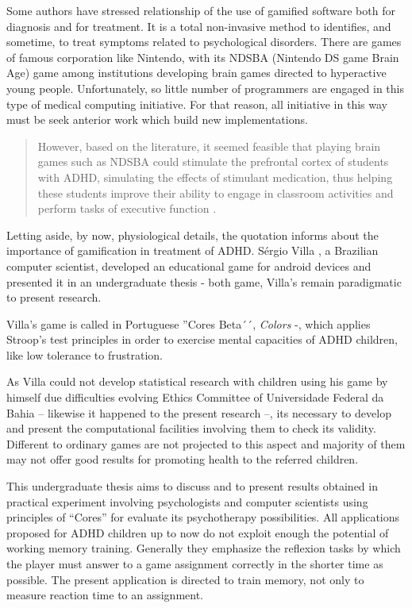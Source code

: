 Some authors have stressed relationship of the use of gamified software both for diagnosis and for treatment. It is a total non-invasive method to identifies, and sometime, to treat symptoms related to psychological disorders. There are games of famous corporation like Nintendo, with its NDSBA (Nintendo DS game Brain Age) game among institutions developing brain games directed to hyperactive young people. Unfortunately, so little number of programmers are engaged in this type of medical computing initiative. For that reason, all initiative in this way must be seek anterior work which build new implementations. 

\begin{quote}
However, based on the literature, it seemed feasible that playing brain games such as NDSBA could stimulate the prefrontal cortex of students with ADHD, simulating the effects of stimulant medication, thus helping these students improve their ability to engage in classroom activities and perform tasks of executive function \citep{brainGames}. 
\end{quote}

Letting aside, by now, physiological details, the quotation informs about the importance of gamification in treatment of ADHD. S\'{e}rgio Villa \citeyearpar{Villa}, a Brazilian computer scientist, developed an educational game for android devices and presented it in an undergraduate thesis - both game, Villa's remain paradigmatic to present research.

Villa's game is called in Portuguese ''Cores Beta´´, \textit{Colors} -, which applies Stroop's test principles in order to exercise mental capacities of ADHD children, like low tolerance to frustration. 

As Villa \citeyearpar{Villa} could not develop statistical research with children using his game by himself due difficulties evolving Ethics Committee of Universidade Federal da Bahia -- likewise it happened to the present research --, its necessary to develop and present the computational facilities involving them to check its validity. Different to ordinary games are not projected to this aspect and majority of them may not offer good results for promoting health to the referred children. 

This undergraduate thesis aims to discuss and to present results obtained in practical experiment involving psychologists and computer scientists using principles of ``Cores'' for evaluate its psychotherapy possibilities. All applications proposed for ADHD children up to now do not exploit enough the potential of working memory training. Generally they emphasize the reflexion tasks by which the player must answer to a game assignment correctly in the shorter time as possible. The present application is directed to train memory, not only to measure reaction time to an assignment.


